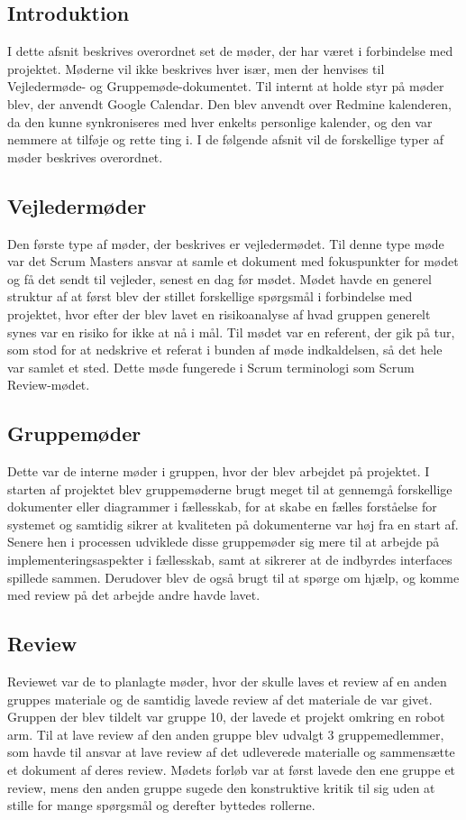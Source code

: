 \documentclass[a4paper,12pt,fleqn,oneside]{article}
\begin{document}
\subsection{Introduktion}
I dette afsnit beskrives overordnet set de møder, der har været i forbindelse med projektet. Møderne vil ikke beskrives hver især, men der henvises til Vejledermøde- og Gruppemøde-dokumentet. Til internt at holde styr på møder blev, der anvendt Google Calendar. Den blev anvendt over Redmine kalenderen, da den kunne synkroniseres med hver enkelts personlige kalender, og den var nemmere at tilføje og rette ting i. I de følgende afsnit vil de forskellige typer af møder beskrives overordnet.
\subsection{Vejledermøder}
Den første type af møder, der beskrives er vejledermødet. Til denne type møde var det Scrum Masters ansvar at samle et dokument med fokuspunkter for mødet og få det sendt til vejleder, senest en dag før mødet. Mødet havde en generel struktur af at først blev der stillet forskellige spørgsmål i forbindelse med projektet, hvor efter der blev lavet en risikoanalyse af hvad gruppen generelt synes var en risiko for ikke at nå i mål. Til mødet var en referent, der gik på tur, som stod for at nedskrive et referat i bunden af møde indkaldelsen, så det hele var samlet et sted. Dette møde fungerede i Scrum terminologi som Scrum Review-mødet.
\subsection{Gruppemøder}
Dette var de interne møder i gruppen, hvor der blev arbejdet på projektet. I starten af projektet blev gruppemøderne brugt meget til at gennemgå forskellige dokumenter eller diagrammer i fællesskab, for at skabe en fælles forståelse for systemet og samtidig sikrer at kvaliteten på dokumenterne var høj fra en start af. Senere hen i processen udviklede disse gruppemøder sig mere til at arbejde på implementeringsaspekter i fællesskab, samt at sikrerer at de indbyrdes interfaces spillede sammen. Derudover blev de også brugt til at spørge om hjælp, og komme med review på det arbejde andre havde lavet.
\subsection{Review}
Reviewet var de to planlagte møder, hvor der skulle laves et review af en anden gruppes materiale og de samtidig lavede review af det materiale de var givet. Gruppen der blev tildelt var gruppe 10, der lavede et projekt omkring en robot arm. Til at lave review af den anden gruppe blev udvalgt 3 gruppemedlemmer, som havde til ansvar at lave review af det udleverede materialle og sammensætte et dokument af deres review.  Mødets forløb var at først lavede den ene gruppe et review, mens den anden gruppe sugede den konstruktive kritik til sig uden at stille for mange spørgsmål og derefter byttedes rollerne. 
\end{document}
